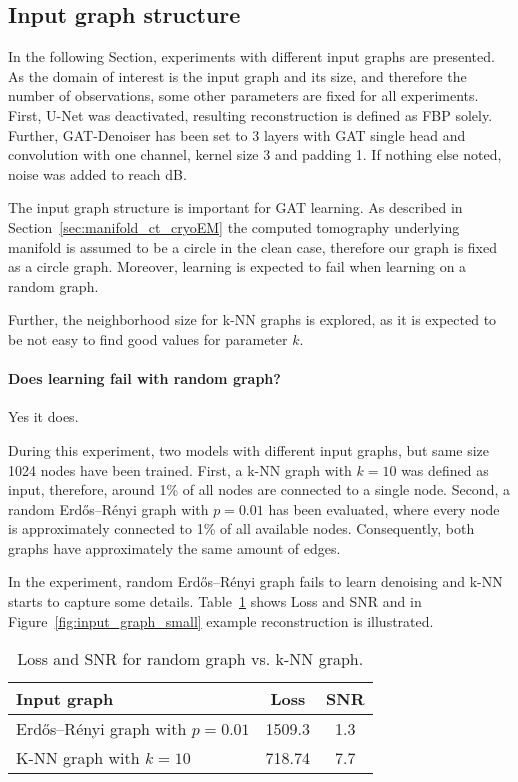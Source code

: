   \subsection{Input graph structure}
  In the following Section, experiments with different input graphs are presented.
  As the domain of interest is the input graph and its size, and therefore the number of observations, 
  some other parameters are fixed for all experiments.
  First, U-Net was deactivated, resulting reconstruction is defined as FBP solely.
  Further, GAT-Denoiser has been set to 3 layers with GAT single head and convolution 
  with one channel, kernel size 3 and padding 1. 
  If nothing else noted, noise was added to reach  dB.

  The input graph structure is important for GAT learning. As described in Section~\ref{sec:manifold_ct_cryoEM}
  \textit{} the computed tomography underlying manifold is assumed to be a circle 
  in the clean case, therefore our graph is fixed as a circle graph. 
  Moreover, learning is expected to fail when learning on a random graph.

  Further, the neighborhood size for k-NN graphs is explored, as it is expected to be not easy to find 
  good values for parameter $k$.

  \paragraph{Does learning fail with random graph?}
  Yes it does.

  During this experiment, two models with different input graphs, but same size 1024 nodes have been trained.
  First, a k-NN graph with $k=10$ was defined as input, therefore, around 1\%  of all nodes are connected to a single node.
  Second, a random Erdős–Rényi graph with $p=0.01$ has been evaluated, where every node is 
  approximately connected to 1\% of all available nodes. Consequently, both graphs have approximately the same amount of edges.
  
  In the experiment, random Erdős–Rényi graph fails to learn denoising and k-NN starts to capture some details.
  Table~\ref{tab:input_graph} shows Loss and SNR and in Figure~\ref{fig:input_graph_small} example reconstruction is illustrated.

  \begin{table}[H]
    \centering
      \begin{tabular}{l|cc}
      \toprule
      \textbf{Input graph} & \textbf{Loss} & \textbf{SNR}  \\ 
      \midrule
      Erdős–Rényi graph with $p=0.01$    &  1509.3          &  1.3   \\ \hline
      K-NN graph with $k=10$       &  718.74          &  7.7    \\ \hline
      \midrule
      \end{tabular}
    \caption{Loss and SNR for random graph vs. k-NN graph. }
    \label{tab:input_graph}
  \end{table}
  

